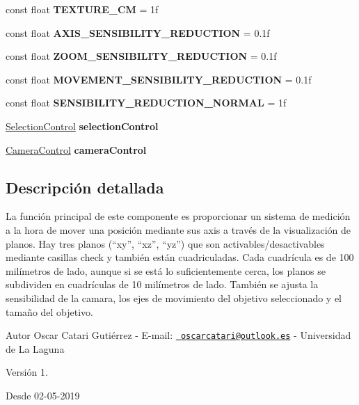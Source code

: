 \begin{DoxyCompactItemize}
const float {\bfseries T\+E\+X\+T\+U\+R\+E\+\_\+CM} = 1f
\item 
\mbox{\label{class_metric_system_control_a9db04ec2771e361c45bb0fd754ae5713}} 
const float {\bfseries A\+X\+I\+S\+\_\+\+S\+E\+N\+S\+I\+B\+I\+L\+I\+T\+Y\+\_\+\+R\+E\+D\+U\+C\+T\+I\+ON} = 0.\+1f
\item 
\mbox{\label{class_metric_system_control_a55765b790738a6a425bc7d9419768966}} 
const float {\bfseries Z\+O\+O\+M\+\_\+\+S\+E\+N\+S\+I\+B\+I\+L\+I\+T\+Y\+\_\+\+R\+E\+D\+U\+C\+T\+I\+ON} = 0.\+1f
\item 
\mbox{\label{class_metric_system_control_a09bb535f3f0dc3a0148aae3127cac3aa}} 
const float {\bfseries M\+O\+V\+E\+M\+E\+N\+T\+\_\+\+S\+E\+N\+S\+I\+B\+I\+L\+I\+T\+Y\+\_\+\+R\+E\+D\+U\+C\+T\+I\+ON} = 0.\+1f
\item 
\mbox{\label{class_metric_system_control_a96682b2e978aed50d76d421ec2e32930}} 
const float {\bfseries S\+E\+N\+S\+I\+B\+I\+L\+I\+T\+Y\+\_\+\+R\+E\+D\+U\+C\+T\+I\+O\+N\+\_\+\+N\+O\+R\+M\+AL} = 1f
\item 
\mbox{\label{class_metric_system_control_a45a8cce245251be2e23e7d2aae47148f}} 
\mbox{\hyperlink{class_selection_control}{Selection\+Control}} {\bfseries selection\+Control}
\item 
\mbox{\label{class_metric_system_control_a07ba2765128276abd787a07740080c41}} 
\mbox{\hyperlink{class_camera_control}{Camera\+Control}} {\bfseries camera\+Control}
\end{DoxyCompactItemize}


\subsection{Descripción detallada}
La función principal de este componente es proporcionar un sistema de medición a la hora de mover una posición mediante sus axis a través de la visualización de planos. Hay tres planos (“xy”, “xz”, “yz”) que son activables/desactivables mediante casillas check y también están cuadriculadas. Cada cuadrícula es de 100 milímetros de lado, aunque si se está lo suficientemente cerca, los planos se subdividen en cuadrículas de 10 milímetros de lado. También se ajusta la sensibilidad de la camara, los ejes de movimiento del objetivo seleccionado y el tamaño del objetivo. \begin{DoxyAuthor}{Autor}
Oscar Catari Gutiérrez -\/ E-\/mail\+: \href{mailto:oscarcatari@outlook.es}{\texttt{ oscarcatari@outlook.\+es}} -\/ Universidad de La Laguna 
\end{DoxyAuthor}
\begin{DoxyVersion}{Versión}
1. 
\end{DoxyVersion}
\begin{DoxySince}{Desde}
02-\/05-\/2019 
\end{DoxySince}


